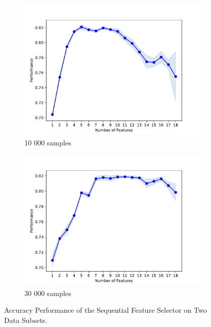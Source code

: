 \documentclass[]{article}
\begin{document}
	\begin{figure}[ht]
		\centering
		\begin{subfigure}{\textwidth}
			\centering
		\includegraphics[width=0.9\linewidth]{feature selection/feature_num_performance_10k.pdf}
		\caption{10 000 samples}
		\end{subfigure}
		
		\begin{subfigure}{\textwidth}
		\centering
		\includegraphics[width=0.9\linewidth]{feature selection/feature_num_performance_30k.pdf}
		\caption{30 000 samples}
		\end{subfigure}
		\caption{Accuracy Performance of the Sequential Feature Selector on Two Data Subsets.}
		\label{fig:SFS_results}
	\end{figure}
	
\end{document}
